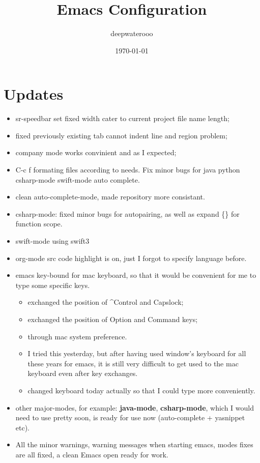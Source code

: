 \documentclass[9pt, b5paper]{article}
\author{deepwaterooo}
\date{\today}
\title{Emacs Configuration}
\begin{document}
\maketitle
\tableofcontents


\section{Updates}
\label{sec-1}
\begin{itemize}
\item sr-speedbar set fixed width cater to current project file name length;
\item fixed previously existing tab cannot indent line and region problem;
\item company mode works convinient and as I expected;
\item C-c f formating files according to needs. Fix minor bugs for java python csharp-mode swift-mode auto complete.
\item clean auto-complete-mode, made repository more consistant.
\item csharp-mode: fixed minor bugs for autopairing, as well as expand \{\} for function scope.
\item swift-mode using swift3
\item org-mode src code highlight is on, just I forgot to specify language before.
\item emacs key-bound for mac keyboard, so that it would be convenient for me to type some specific keys. 
\begin{itemize}
\item exchanged the position of \^{}Control and Capslock;
\item exchanged the position of Option and Command keys;
\item through mac system preference.
\item I tried this yesterday, but after having used window's keyboard for all these years for emacs, it is still very difficult to get used to the mac keyboard even after key exchanges.
\item changed keyboard today actually so that I could type more conveniently.
\end{itemize}
\item other major-modes, for example: \textbf{java-mode}, \textbf{csharp-mode}, which I would need to use pretty soon, is ready for use now (auto-complete + yasnippet etc).
\item All the minor warnings, warning messages when starting emacs, modes fixes are all fixed, a clean Emacs open ready for work.
\end{itemize}
\end{document}
